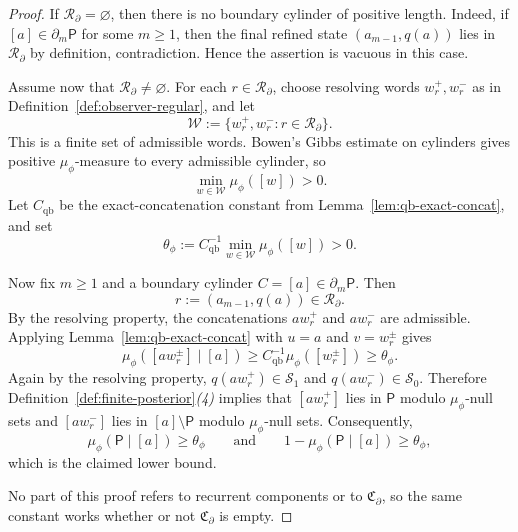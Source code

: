 \documentclass{etds}%
\numberwithin{equation}{section}
\theoremstyle{plain}
\theoremstyle{definition}
\theoremstyle{remark}
\begin{document}
\begin{proof}
If $\mathcal{R}_\partial=\varnothing$, then there is no boundary cylinder of
positive length.  Indeed, if $[a]\in\partial_m\mathsf{P}$ for some $m\ge 1$,
then the final refined state $(a_{m-1},q(a))$ lies in $\mathcal{R}_\partial$
by definition, contradiction.  Hence the assertion is vacuous in this case.

Assume now that $\mathcal{R}_\partial\neq\varnothing$.  For each
$r\in\mathcal{R}_\partial$, choose resolving words $w_r^+,w_r^-$ as in
Definition~\ref{def:observer-regular}, and let
\[
\mathcal{W}:=\{w_r^+,w_r^-:r\in\mathcal{R}_\partial\}.
\]
This is a finite set of admissible words.  Bowen's Gibbs estimate on cylinders
\cite{Bowen1975,WaltersErgodicTheory} gives positive $\mu_\phi$-measure to
every admissible cylinder, so
\[
\min_{w\in\mathcal{W}}\mu_\phi([w])>0.
\]
Let $C_{\mathrm{qb}}$ be the exact-concatenation constant from
Lemma~\ref{lem:qb-exact-concat}, and set
\[
\theta_\phi
:=C_{\mathrm{qb}}^{-1}\min_{w\in\mathcal{W}}\mu_\phi([w])>0.
\]

Now fix $m\ge 1$ and a boundary cylinder $C=[a]\in\partial_m\mathsf{P}$.
Then
\[
r:=(a_{m-1},q(a))\in\mathcal{R}_\partial.
\]
By the resolving property, the concatenations $aw_r^+$ and $aw_r^-$ are
admissible.  Applying Lemma~\ref{lem:qb-exact-concat} with $u=a$ and
$v=w_r^\pm$ gives
\[
\mu_\phi([aw_r^\pm]\mid[a])
\ge C_{\mathrm{qb}}^{-1}\mu_\phi([w_r^\pm])
\ge \theta_\phi.
\]
Again by the resolving property,
$q(aw_r^+)\in\mathcal{S}_1$ and $q(aw_r^-)\in\mathcal{S}_0$.  Therefore
Definition~\ref{def:finite-posterior}\emph{(4)} implies that $[aw_r^+]$ lies
in $\mathsf{P}$ modulo $\mu_\phi$-null sets and $[aw_r^-]$ lies in
$[a]\setminus\mathsf{P}$ modulo $\mu_\phi$-null sets.  Consequently,
\[
\mu_\phi(\mathsf{P}\mid[a])\ge \theta_\phi
\qquad\text{and}\qquad
1-\mu_\phi(\mathsf{P}\mid[a])\ge \theta_\phi,
\]
which is the claimed lower bound.

No part of this proof refers to recurrent components or to
$\mathfrak{C}_\partial$, so the same constant works whether or not
$\mathfrak{C}_\partial$ is empty.
\end{proof}
\end{document}
